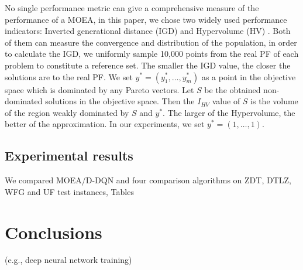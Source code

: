 \documentclass[journal]{IEEEtran}
\begin{document}
No single performance metric can give a comprehensive measure of the performance of a MOEA, in this paper, we chose two widely used performance indicators: Inverted generational distance (IGD) \cite{igd} and Hypervolume (HV) \cite{hv}.
Both of them can measure the convergence and distribution of the population, in order to calculate the IGD, we uniformly sample 10,000 points from the real PF of each problem to constitute a reference set. The smaller the IGD value, the closer the solutions are to the real PF.
We set $y^* = (y^*_1, \dots, y^*_m)$ as a point in the objective space which is dominated by any Pareto vectors. Let $S$ be the obtained non-dominated solutions in the objective space. Then the $I_{HV}$ value of $S$ is the volume of the region weakly dominated by $S$ and $y^*$. The larger of the Hypervolume, the better of the approximation. In our experiments, we set $y^* = (1,\dots, 1).$

\subsection{Experimental results}
We compared MOEA/D-DQN and four comparison algorithms on ZDT, DTLZ, WFG and UF test instances, Tables








\section{Conclusions}


 (e.g., deep neural network training)

\ifCLASSOPTIONcaptionsoff
  \newpage
\fi



\end{document}
